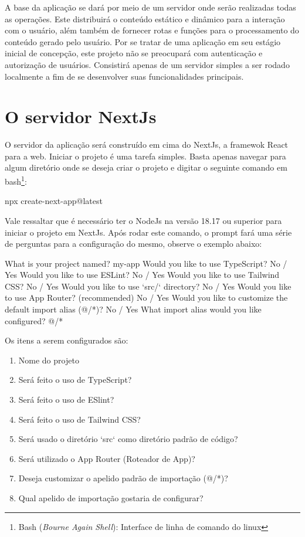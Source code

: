 A base da aplicação se dará por meio de um servidor onde serão realizadas
todas as operações. Este distribuirá o conteúdo estático e dinâmico
para a interação com o usuário, além também de fornecer rotas e funções
para o processamento do conteúdo gerado pelo usuário.
Por se tratar de uma aplicação em seu estágio inicial de concepção,
este projeto não se preocupará com autenticação e autorização de usuários.
Consistirá apenas de um servidor simples a ser rodado localmente a fim de
se desenvolver suas funcionalidades principais.

\section{O servidor NextJs}

O servidor da aplicação será construído em cima do NextJs, a
framewok React para a
\acrshort{web}.
Iniciar o projeto é uma tarefa simples. Basta apenas navegar
para algum diretório onde se deseja criar o projeto e
digitar o seguinte comando em
\acrshort{bash}\footnote{Bash (\textit{Bourne Again Shell}): Interface de linha de comando do linux
}:

\begin{createNextJsCommand}
npx create-next-app@latest
\end{createNextJsCommand}

Vale ressaltar que é necessário ter o NodeJs na versão 18.17 ou superior
para iniciar o projeto em NextJs. Após rodar este comando, o prompt fará uma
série de perguntas para a configuração do mesmo, observe o exemplo abaixo:

\begin{promptNextJs}
What is your project named? my-app
Would you like to use TypeScript? No / Yes
Would you like to use ESLint? No / Yes
Would you like to use Tailwind CSS? No / Yes
Would you like to use `src/` directory? No / Yes
Would you like to use App Router? (recommended) No / Yes
Would you like to customize the default import alias (@/*)? No / Yes
What import alias would you like configured? @/*
\end{promptNextJs}

Os itens a serem configurados são:

\begin{enumerate}
        
	\item Nome do projeto
	\item Será feito o uso de TypeScript?
	\item Será feito o uso de ESlint?
	\item Será feito o uso de Tailwind CSS?
	\item Será usado o diretório `src` como diretório padrão de código?
	\item Será utilizado o App Router (Roteador de App)?
	\item Deseja customizar o apelido padrão de importação (@/*)?
	\item Qual apelido de importação gostaria de configurar?
    
\end{enumerate}

